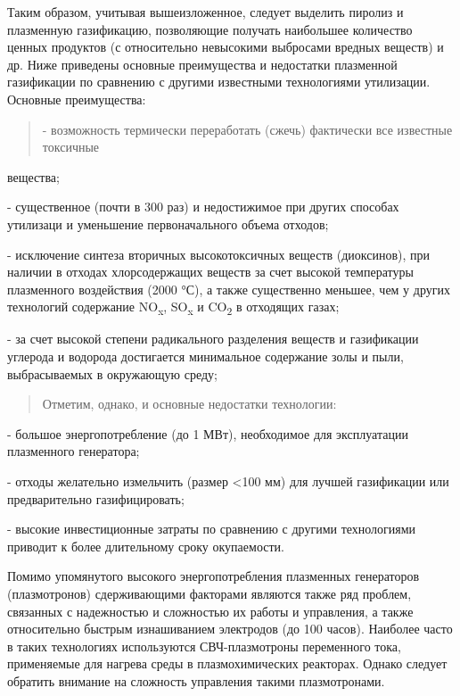 Таким образом, учитывая вышеизложенное, следует выделить пиролиз и
плазменную газификацию, позволяющие получать наибольшее количество
ценных продуктов (с относительно невысокими выбросами вредных веществ) и
др. Ниже приведены основные преимущества и недостатки плазменной
газификации по сравнению с другими известными технологиями утилизации.
Основные преимущества:

\begin{quote}
- возможность термически переработать (сжечь) фактически все известные
токсичные
\end{quote}

вещества;

- существенное (почти в 300 раз) и недостижимое при других способах
утилизаци и уменьшение первоначального объема отходов;

- исключение синтеза вторичных высокотоксичных веществ (диоксинов), при
наличии в отходах хлорсодержащих веществ за счет высокой температуры
плазменного воздействия (2000 °С), а также существенно меньшее, чем у
других технологий содержание NO\textsubscript{x}, SO\textsubscript{x} и
CO\textsubscript{2} в отходящих газах;

- за счет высокой степени радикального разделения веществ и газификации
углерода и водорода достигается минимальное содержание золы и пыли,
выбрасываемых в окружающую среду;

\begin{quote}
Отметим, однако, и основные недостатки технологии:
\end{quote}

- большое энергопотребление (до 1 МВт), необходимое для эксплуатации
плазменного генератора;

- отходы желательно измельчить (размер \textless100 мм) для лучшей
газификации или предварительно газифицировать;

- высокие инвестиционные затраты по сравнению с другими технологиями
приводит к более длительному сроку окупаемости.

Помимо упомянутого высокого энергопотребления плазменных генераторов
(плазмотронов) сдерживающими факторами являются также ряд проблем,
связанных с надежностью и сложностью их работы и управления, а также
относительно быстрым изнашиванием электродов (до 100 часов). Наиболее
часто в таких технологиях используются СВЧ-плазмотроны переменного тока,
применяемые для нагрева среды в плазмохимических реакторах. Однако
следует обратить внимание на сложность управления такими плазмотронами.

